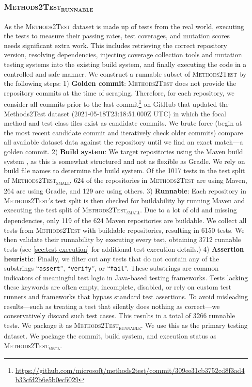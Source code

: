 \documentclass[12pt]{book}
\begin{document}
\subsubsection{\textsc{Methods2Test\textsubscript{runnable}}}
\label{sec:methods2test-runnable}
As the \textsc{Methods2Test} dataset is made up of tests from the real world, executing the tests to measure their passing rates, test coverages, and mutation scores needs significant extra work. This includes retrieving the correct repository version, resolving dependencies, injecting coverage collection tools and mutation testing systems into the existing build system, and finally executing the code in a controlled and safe manner. We construct a runnable subset of \textsc{Methods2Test} by the following steps: 1)  \textbf{Golden commit}: \textsc{Methods2Test} does not provide the repository commits at the time of scraping. Therefore, for each repository, we consider all commits prior to the last commit\footnote{\url{https://github.com/microsoft/methods2test/commit/309ee31cb3752cd8f3ad4b33cfd2b6e5b0ec5029}} on GitHub that updated the Methods2Test dataset (2021-05-18T23:18:51.000Z UTC) in which the focal method and test class files exist as candidate commits. We brute force (begin at the most recent candidate commit and iteratively check older commits)  compare all available dataset data against the repository until we find an exact match---a golden commit. 2) \textbf{Build system}: We target repositories using the Maven build system \citep{apache-maven:3.8.1}, as this is somewhat structured and not as flexible as Gradle. We rely on build file names to determine the build system. Of the 1017 tests in the test split of \textsc{Methods2Test\textsubscript{small}}, 624 of the repositories in \textsc{Methods2Test} are using Maven, 264 are using Gradle, and 129 are using others. 3) \textbf{Runnable}: Each repository in \textsc{Methods2Test}'s test split is then checked for buildability by running Maven and executing the test split of \textsc{Methods2Test\textsubscript{small}}. Due to a lot of old and missing dependencies, only 119 of the 624 Maven repositories are buildable. We collect all tests from \textsc{Methods2Test} with buildable repositories, resulting in 6150 tests. We then validate their runnability by executing every test, obtaining 3712 runnable tests (see \cref{sec:test-execution} for additional test execution details.) 
4) \textbf{Assertion heuristic}: Finally, we filter out any tests that do not contain any of the substrings  ``\texttt{assert}'', ``\texttt{verify}'', or ``\texttt{fail}''. These substrings are common indicators of meaningful test logic in Java-based testing frameworks. Tests lacking these keywords are often empty, incomplete, disabled, or rely on custom test runners and frameworks that bypass standard test assertions. To avoid misleading results—such as treating a test that silently does nothing as correct—we conservatively discard such test cases. This results in a total of 3266 runnable tests. We package it as \textsc{Methods2Test\textsubscript{runnable}}. We use this as the primary testing dataset.
\noindent We package the commit, build system, and execution status as \textsc{Methods2Test\textsubscript{meta}}.
\end{document}
